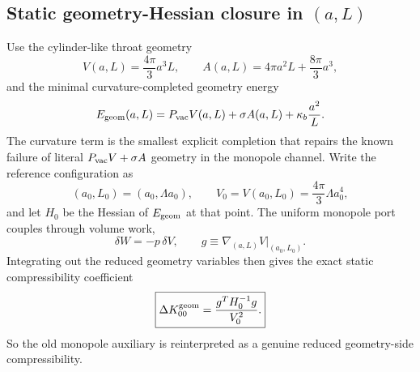 \documentclass[11pt]{article}
\begin{document}
\subsection{Static geometry-Hessian closure in \texorpdfstring{$(a,L)$}{(a,L)}}
\label{app:geom-breathing-static-hessian}

Use the cylinder-like throat geometry
\begin{equation}
V(a,L)=\frac{4\pi}{3}a^3L,
\qquad
A(a,L)=4\pi a^2L+\frac{8\pi}{3}a^3,
\label{eq:geom-breathing-VA}
\end{equation}
and the minimal curvature-completed geometry energy
\begin{equation}
E_{\rm geom}(a,L)
=
P_{\rm vac}V(a,L)+\sigma A(a,L)+\kappa_b\frac{a^2}{L}.
\label{eq:geom-breathing-Egeom}
\end{equation}
The curvature term is the smallest explicit completion that repairs the known failure of
literal \(P_{\rm vac}V+\sigma A\) geometry in the monopole channel.
Write the reference configuration as
\begin{equation}
(a_0,L_0)=(a_0,\Lambda a_0),
\qquad
V_0=V(a_0,L_0)=\frac{4\pi}{3}\Lambda a_0^4,
\label{eq:geom-breathing-reference}
\end{equation}
and let \(H_0\) be the Hessian of \(E_{\rm geom}\) at that point.
The uniform monopole port couples through volume work,
\begin{equation}
\delta W=-p\,\delta V,
\qquad
g\equiv \nabla_{(a,L)}V\big|_{(a_0,L_0)}.
\label{eq:geom-breathing-volume-work}
\end{equation}
Integrating out the reduced geometry variables then gives the exact static compressibility
coefficient
\begin{equation}
\boxed{
\Delta K_{00}^{\rm geom}
=
\frac{g^T H_0^{-1}g}{V_0^2}.
}
\label{eq:geom-breathing-static-compressibility}
\end{equation}
So the old monopole auxiliary is reinterpreted as a genuine reduced geometry-side
compressibility.
\end{document}
